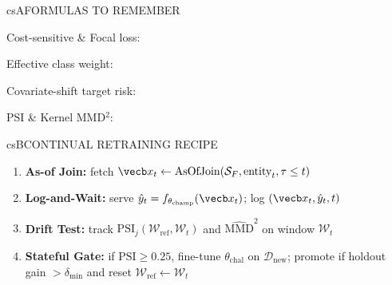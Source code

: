 \documentclass[../../../../master.tex]{subfiles}
\begin{document}
\begin{cscolumns}
\begin{cscard}{csA}{FORMULAS TO REMEMBER}
  \begin{csbul}
    \item Cost-sensitive \& Focal loss:
    \item Effective class weight:
    \item Covariate-shift target risk:
    \item PSI \& Kernel MMD$^2$:
  \end{csbul}
\end{cscard}

\begin{cscard}{csB}{CONTINUAL RETRAINING RECIPE}
  \begin{enumerate}[leftmargin=1.2em, itemsep=1pt, topsep=1pt, parsep=0pt]
    \item \textbf{As-of Join:} fetch $\vecb x_t\leftarrow\mathrm{AsOfJoin}(\mathcal{S}_F,\text{entity}_t,\tau\le t)$
    \item \textbf{Log-and-Wait:} serve $\hat y_t=f_{\theta_{\mathrm{champ}}}(\vecb x_t)$; log $(\vecb x_t,\hat y_t,t)$
    \item \textbf{Drift Test:} track $\mathrm{PSI}_j(\mathcal{W}_{\mathrm{ref}},\mathcal{W}_t)$ and $\widehat{\mathrm{MMD}}^2$ on window $\mathcal{W}_t$
    \item \textbf{Stateful Gate:} if $\mathrm{PSI}\ge 0.25$, fine-tune $\theta_{\mathrm{chal}}$ on $\mathcal{D}_{\mathrm{new}}$; promote if holdout gain $>\delta_{\min}$ and reset $\mathcal{W}_{\mathrm{ref}}\leftarrow\mathcal{W}_t$
  \end{enumerate}
\end{cscard}
\columnbreak


\end{cscolumns}
\end{document}
